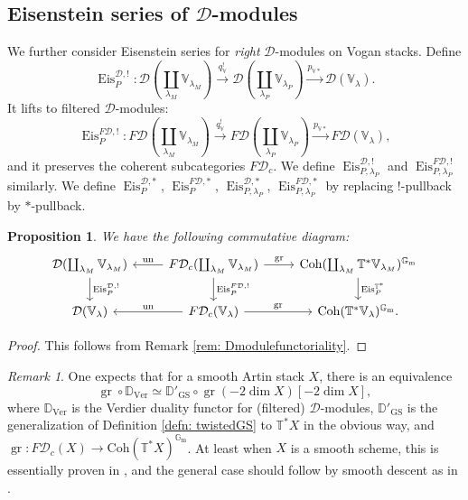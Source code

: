 \documentclass{amsart}
\newtheorem{proposition}[theorem]{Proposition}
\theoremstyle{definition}
\theoremstyle{remark}
\newtheorem{remark}[theorem]{Remark}
\numberwithin{equation}{section}
\newcommand{\mc}{\mathcal}
\newcommand{\Gm}{{\mathbb{G}_{\mathrm{m}}}}
\newcommand{\D}{\mathbb{D}}
\DeclareMathOperator{\Eis}{\mathrm{Eis}}
\newcommand{\Coh}{\mathrm{Coh}}
\newcommand{\GS}{\mathrm{GS}}
\newcommand{\V}{\mathbb{V}}
\newcommand{\T}{\mathbb{T}}
\DeclareMathOperator{\gr}{gr}
\begin{document}
\subsection{Eisenstein series of \texorpdfstring{$\mathcal{D}$}{D}-modules}
We further consider Eisenstein series for \emph{right} $\mathcal{D}$-modules on Vogan stacks. Define
\[
\Eis_P^{\mc{D},!}\colon \mc{D}(\coprod_{\lambda_M} \V_{\lambda_M}) \xrightarrow{q_\V^!} \mc{D} (\coprod_{\lambda_P} \V_{\lambda_P}) \xrightarrow{p_{\V*}} \mc{D}(\V_\lambda). 
\]
It lifts to filtered $\mc{D}$-modules:
\[
\Eis_P^{F\mc{D}, !}\colon F\mc{D}(\coprod_{\lambda_M} \V_{\lambda_M}) \xrightarrow{q_\V^!} F\mc{D} (\coprod_{\lambda_P} \V_{\lambda_P}) \xrightarrow{p_{\V*}} F\mc{D}(\V_\lambda), 
\]
and it preserves the coherent subcategories $F\mathcal{D}_c$. We define $\Eis_{P,\lambda_P}^{\mc{D}, !}$ and $\Eis_{P,\lambda_P}^{F\mc{D}, !}$ similarly. 
We define $\Eis_P^{\mc{D},*}$, $\Eis_P^{F\mc{D},*}$, $\Eis_{P, \lambda_P}^{\mc{D},*}$, $\Eis_{P, \lambda_P}^{F\mc{D},*}$ by replacing $!$-pullback by $*$-pullback.  

\begin{proposition}
We have the following commutative diagram:
\[
\begin{tikzcd}
\mc{D} (\coprod_{\lambda_M} \V_{\lambda_M}) 
\arrow[d, "\Eis_P^{\mc{D}, !}"]
& 
F\mc{D}_c(\coprod_{\lambda_M} \V_{\lambda_M}) 
\arrow[l, "\mathrm{un}"'] 
\arrow[r, "\mathrm{gr}"]
\arrow[d, "\Eis_P^{F\mc{D}, !}"] 
& 
\Coh(\coprod_{\lambda_M} \T^{\ast}\V_{\lambda_M})^\Gm 
\arrow[d, "\Eis_P^{\T^*}"] 
\\
\mc{D}(\V_\lambda) 
& 
F\mc{D}_c(\V_\lambda) 
\arrow[l, "\mathrm{un}"'] 
\arrow[r, "\mathrm{gr}"]
& 
\Coh(\T^{\ast}\V_\lambda)^\Gm. 
\end{tikzcd}
\]
\end{proposition}

\begin{proof}
    This follows from Remark \ref{rem: Dmodulefunctoriality}.
\end{proof}
\begin{remark}
    One expects that for a smooth Artin stack $X$, there is an equivalence
    \begin{equation*}
        \gr \circ \D_{\mathrm{Ver}} \simeq \D'_{\GS} \circ \gr(-2\dim X) [- 2 \dim X],
    \end{equation*}
    where $\D_{\mathrm{Ver}}$ is the Verdier duality functor for (filtered) $\mc{D}$-modules, $\D'_{\GS}$ is the generalization of Definition \ref{defn: twistedGS} to $\T^{\ast}X$ in the obvious way, and $\gr\colon F\mc{D}_c(X) \rightarrow \Coh(\T^{\ast}X)^{\Gm}$. At least when $X$ is a smooth scheme, this is essentially proven in \cite[Proposition 2.3]{SaitoSchnellDuality}, and the general case should follow by smooth descent as in \cite[Proposition 3.3.18]{Chen2023categorical}. 
    \end{remark}
\end{document}
